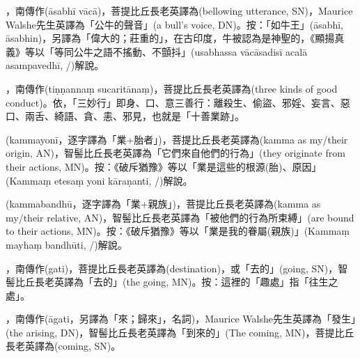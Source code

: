 \startitemgroup[noteitems]
\item{}，南傳作(āsabhī vācā)，菩提比丘長老英譯為(bellowing utterance, SN)，Maurice Walshe先生英譯為「公牛的聲音」(a bull's voice, DN)。按：「如牛王」(āsabhī, āsabhin)，另譯為「偉大的；莊重的」，在古印度，牛被認為是神聖的，《顯揚真義》等以「等同公牛之語不搖動、不顫抖」(usabhassa vācāsadisī acalā asampavedhī, /)解說。
\stopitemgroup

\startitemgroup[noteitems]
\item{}，南傳作(tiṇṇannaṃ sucaritānaṃ)，菩提比丘長老英譯為(three kinds of good conduct)。依，「三妙行」即身、口、意三善行：離殺生、偷盜、邪婬、妄言、惡口、兩舌、綺語、貪、恚、邪見，也就是「十善業跡」。
\stopitemgroup

\startitemgroup[noteitems]
\item{}(kammayonī，逐字譯為「業+胎者」)，菩提比丘長老英譯為(kamma as my/their origin, AN)，智髻比丘長老英譯為「它們來自他們的行為」(they originate from their actions, MN)。按：《破斥猶豫》等以「業是這些的根源(胎)、原因」(Kammaṃ etesaṃ yoni kāraṇanti, /)解說。
\stopitemgroup

\startitemgroup[noteitems]
\item{}(kammabandhū，逐字譯為「業+親族」)，菩提比丘長老英譯為(kamma as my/their relative, AN)，智髻比丘長老英譯為「被他們的行為所束縛」(are bound to their actions, MN)。按：《破斥猶豫》等以「業是我的眷屬(親族)」(Kammaṃ mayhaṃ bandhūti, /)解說。
\stopitemgroup

\startitemgroup[noteitems]
\item{}，南傳作(gati)，菩提比丘長老英譯為(destination)，或「去的」(going, SN)，智髻比丘長老英譯為「去的」(the going, MN)。按：這裡的「趣處」指「往生之處」。
\item{}，南傳作(āgati，另譯為「來；歸來」，名詞)，Maurice Walshe先生英譯為「發生」(the arising, DN)，智髻比丘長老英譯為「到來的」(The coming, MN)，菩提比丘長老英譯為(coming, SN)。
\stopitemgroup


